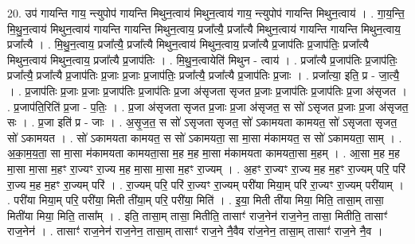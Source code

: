 \documentclass[17pt]{extarticle}
\begin{document}
20. उप॑ गायन्ति गाय॒ न्त्युपोप॑ गायन्ति मिथुन॒त्वाय॑ मिथुन॒त्वाय॑ गाय॒ न्त्युपोप॑ गायन्ति मिथुन॒त्वाय॑ । . गा॒य॒न्ति॒ मि॒थु॒न॒त्वाय॑ मिथुन॒त्वाय॑ गायन्ति गायन्ति मिथुन॒त्वाय॒ प्रजा᳚त्यै॒ प्रजा᳚त्यै मिथुन॒त्वाय॑ गायन्ति गायन्ति मिथुन॒त्वाय॒ प्रजा᳚त्यै । . मि॒थु॒न॒त्वाय॒ प्रजा᳚त्यै॒ प्रजा᳚त्यै मिथुन॒त्वाय॑ मिथुन॒त्वाय॒ प्रजा᳚त्यै प्र॒जाप॑तिः प्र॒जाप॑तिः॒ प्रजा᳚त्यै मिथुन॒त्वाय॑ मिथुन॒त्वाय॒ प्रजा᳚त्यै प्र॒जाप॑तिः । . मि॒थु॒न॒त्वायेति॑ मिथुन - त्वाय॑ । . प्रजा᳚त्यै प्र॒जाप॑तिः प्र॒जाप॑तिः॒ प्रजा᳚त्यै॒ प्रजा᳚त्यै प्र॒जाप॑तिः प्र॒जाः प्र॒जाः प्र॒जाप॑तिः॒ प्रजा᳚त्यै॒ प्रजा᳚त्यै प्र॒जाप॑तिः प्र॒जाः । . प्रजा᳚त्या॒ इति॒ प्र - जा॒त्यै॒ । . प्र॒जाप॑तिः प्र॒जाः प्र॒जाः प्र॒जाप॑तिः प्र॒जाप॑तिः प्र॒जा अ॑सृजता सृजत प्र॒जाः प्र॒जाप॑तिः प्र॒जाप॑तिः प्र॒जा अ॑सृजत । . प्र॒जाप॑ति॒रिति॑ प्र॒जा - प॒तिः॒ । . प्र॒जा अ॑सृजता सृजत प्र॒जाः प्र॒जा अ॑सृजत॒ स सो॑ ऽसृजत प्र॒जाः प्र॒जा अ॑सृजत॒ सः । . प्र॒जा इति॑ प्र - जाः । . अ॒सृ॒ज॒त॒ स सो॑ ऽसृजता सृजत॒ सो॑ ऽकामयता कामयत॒ सो॑ ऽसृजता सृजत॒ सो॑ ऽकामयत । . सो॑ ऽकामयता कामयत॒ स सो॑ ऽकामयता॒ सा मा॒सा म॑कामयत॒ स सो॑ ऽकामयता॒ साम् । . अ॒का॒म॒य॒ता॒ सा मा॒सा म॑कामयता कामयता॒सा म॒ह म॒ह मा॒सा म॑कामयता कामयता॒सा म॒हम् । . आ॒सा म॒ह म॒ह मा॒सा मा॒सा म॒हꣳ रा॒ज्यꣳ रा॒ज्य म॒ह मा॒सा मा॒सा म॒हꣳ रा॒ज्यम् । . अ॒हꣳ रा॒ज्यꣳ रा॒ज्य म॒ह म॒हꣳ रा॒ज्यम् परि॒ परि॑ रा॒ज्य म॒ह म॒हꣳ रा॒ज्यम् परि॑ । . रा॒ज्यम् परि॒ परि॑ रा॒ज्यꣳ रा॒ज्यम् परी॑या मिया॒म् परि॑ रा॒ज्यꣳ रा॒ज्यम् परी॑याम् । . परी॑या मिया॒म् परि॒ परी॑या॒ मिती ती॑या॒म् परि॒ परी॑या॒ मिति॑ । . इ॒या॒ मिती ती॑या मिया॒ मिति॒ तासा॒म् तासा॒ मिती॑या मिया॒ मिति॒ तासा᳚म् । . इति॒ तासा॒म् तासा॒ मितीति॒ तासाꣳ॑ राज॒नेन॑ राज॒नेन॒ तासा॒ मितीति॒ तासाꣳ॑ राज॒नेन॑ । . तासाꣳ॑ राज॒नेन॑ राज॒नेन॒ तासा॒म् तासाꣳ॑ राज॒ने नै॒वैव रा॑ज॒नेन॒ तासा॒म् तासाꣳ॑ राज॒ने नै॒व । \newline
\end{document}
